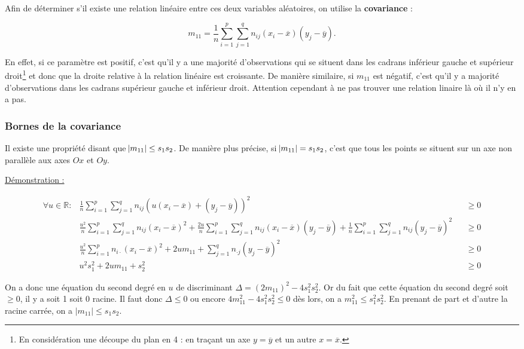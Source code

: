 \documentclass{article}
\begin{document}
		Afin de déterminer s'il existe une relation linéaire entre ces deux variables aléatoires, on utilise la \textbf{covariance} :

		\[m_{11} = \frac 1n\sum_{i=1}^p\sum_{j=1}^qn_{ij}(x_i-\overline x)(y_j-\overline y).\]

		En effet, si ce paramètre est positif, c'est qu'il y a une majorité d'observations qui se situent dans les cadrans inférieur gauche et supérieur droit\footnote{En
		considération une découpe du plan en 4 : en traçant un axe $y = \overline y$ et un autre $x = \overline x$.} et donc que la droite relative à la relation linéaire est
		croissante. De manière similaire, si $m_{11}$ est négatif, c'est qu'il y a majorité d'observations dans les cadrans supérieur gauche et inférieur droit.
		Attention cependant à ne pas trouver une relation linaire là où il n'y en a pas.

		\subsubsection{Bornes de la covariance}
			Il existe une propriété disant que $\abs {m_{11}} \leq s_1s_2$. De manière plus précise, si $\abs {m_{11}} = s_1s_2$, c'est que tous les points se situent sur un axe non
			parallèle aux axes $Ox$ et $Oy$.

			\underline{Démonstration :}

			\[\begin{aligned}
				\forall u \in \mathbb R : &\frac 1n\sum_{i=1}^p\sum_{j=1}^qn_{ij}(u(x_i-\overline x) + (y_j-\overline y))^2 &&\geq 0 \\
										  &\frac {u^2}n\sum_{i=1}^p\sum_{j=1}^qn_{ij}(x_i-\overline x)^2 + \frac {2u}n\sum_{i=1}^p\sum_{j=1}^qn_{ij}(x_i-\overline x)(y_j-\overline y) + \frac 1n\sum_{i=1}^p\sum_{j=1}^qn_{ij}(y_j-\overline y)^2 &&\geq 0 \\
										  & \frac {u^2}n\sum_{i=1}^pn_{i\cdot}(x_i-\overline x)^2 + 2u m_{11} + \sum_{j=1}^qn_{\cdot j}(y_j-\overline y)^2 &&\geq 0 \\
										  &u^2s_1^2 + 2um_{11} + s_2^2 &&\geq 0
			\end{aligned}\]

			On a donc une équation du second degré en $u$ de discriminant $\Delta = (2m_{11})^2 - 4s_1^2s_2^2$. Or du fait que cette équation du second degré soit $\geq 0$, il
			y a soit 1 soit 0 racine. Il faut donc $\Delta \leq 0$ ou encore $4m_{11}^2 - 4s_1^2s_2^2\leq 0$ dès lors, on a $m_{11}^2 \leq s_1^2s_2^2$. En prenant de part et
			d'autre la racine carrée, on a $|m_{11}| \leq s_1s_2$.
			
\end{document}

